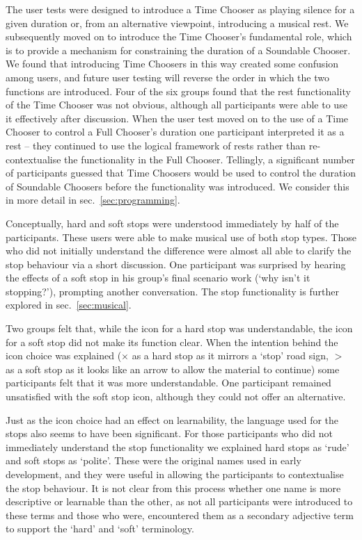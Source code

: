 \documentclass{ppig}
\begin{document}
The user tests were designed to introduce a Time Chooser as playing
silence for a given duration or, from an alternative viewpoint,
introducing a musical rest. We subsequently moved on to introduce the
Time Chooser's fundamental role, which is to provide a mechanism for
constraining the duration of a Soundable Chooser. We found that
introducing Time Choosers in this way created some confusion among
users, and future user testing will reverse the order in which the two
functions are introduced. Four of the six groups found that the rest
functionality of the Time Chooser was not obvious, although all
participants were able to use it effectively after discussion. When the
user test moved on to the use of a Time Chooser to control a Full
Chooser's duration one participant interpreted it as a rest -- they
continued to use the logical framework of rests rather than
re-contextualise the functionality in the Full Chooser. Tellingly, a
significant number of participants guessed that Time Choosers would be
used to control the duration of Soundable Choosers before the
functionality was introduced. We consider this in more detail in
sec.~\ref{sec:programming}.

Conceptually, hard and soft stops were understood immediately by half of
the participants. These users were able to make musical use of both stop
types. Those who did not initially understand the difference were almost
all able to clarify the stop behaviour via a short discussion. One
participant was surprised by hearing the effects of a soft stop in his
group's final scenario work (`why isn't it stopping?'), prompting
another conversation. The stop functionality is further explored in
sec.~\ref{sec:musical}.

Two groups felt that, while the icon for a hard stop was understandable,
the icon for a soft stop did not make its function clear. When the
intention behind the icon choice was explained (\(\times\) as a hard
stop as it mirrors a `stop' road sign, \(>\) as a soft stop as it looks
like an arrow to allow the material to continue) some participants felt
that it was more understandable. One participant remained unsatisfied
with the soft stop icon, although they could not offer an alternative.

Just as the icon choice had an effect on learnability, the language used
for the stops also seems to have been significant. For those
participants who did not immediately understand the stop functionality
we explained hard stops as `rude' and soft stops as `polite'. These were
the original names used in early development, and they were useful in
allowing the participants to contextualise the stop behaviour. It is not
clear from this process whether one name is more descriptive or
learnable than the other, as not all participants were introduced to
these terms and those who were, encountered them as a secondary
adjective term to support the `hard' and `soft' terminology.
\end{document}
